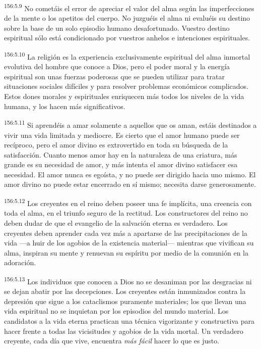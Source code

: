 \par 
\textsuperscript{156:5.9} No cometáis el error de apreciar el valor del alma según las imperfecciones de la mente o los apetitos del cuerpo. No juzguéis el alma ni evaluéis su destino sobre la base de un solo episodio humano desafortunado. Vuestro destino espiritual sólo está condicionado por vuestros anhelos e intenciones espirituales.

\par 
\textsuperscript{156:5.10} La religión es la experiencia exclusivamente espiritual del alma inmortal evolutiva del hombre que conoce a Dios, pero el poder moral y la energía espiritual son unas fuerzas poderosas que se pueden utilizar para tratar situaciones sociales difíciles y para resolver problemas económicos complicados. Estos dones morales y espirituales enriquecen más todos los niveles de la vida humana, y los hacen más significativos.

\par 
\textsuperscript{156:5.11} Si aprendéis a amar solamente a aquellos que os aman, estáis destinados a vivir una vida limitada y mediocre. Es cierto que el amor humano puede ser recíproco, pero el amor divino es extrovertido en toda su búsqueda de la satisfacción. Cuanto menos amor hay en la naturaleza de una criatura, más grande es su necesidad de amor, y más intenta el amor divino satisfacer esa necesidad. El amor nunca es egoísta, y no puede ser dirigido hacia uno mismo. El amor divino no puede estar encerrado en sí mismo; necesita darse generosamente.

\par 
\textsuperscript{156:5.12} Los creyentes en el reino deben poseer una fe implícita, una creencia con toda el alma, en el triunfo seguro de la rectitud. Los constructores del reino no deben dudar de que el evangelio de la salvación eterna es verdadero. Los creyentes deben aprender cada vez más a apartarse de las precipitaciones de la vida ---a huir de los agobios de la existencia material--- mientras que vivifican su alma, inspiran su mente y renuevan su espíritu por medio de la comunión en la adoración.

\par 
\textsuperscript{156:5.13} Los individuos que conocen a Dios no se desaniman por las desgracias ni se dejan abatir por las decepciones. Los creyentes están inmunizados contra la depresión que sigue a los cataclismos puramente materiales; los que llevan una vida espiritual no se inquietan por los episodios del mundo material. Los candidatos a la vida eterna practican una técnica vigorizante y constructiva para hacer frente a todas las vicisitudes y agobios de la vida mortal. Un verdadero creyente, cada día que vive, encuentra \textit{más fácil} hacer lo que es justo.


